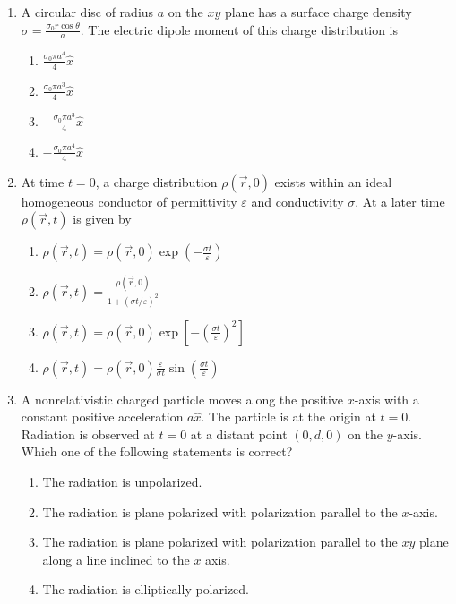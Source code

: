 \documentclass[journal]{IEEEtran}
\begin{document}
\begin{enumerate}
    

 
    \item A circular disc of radius $a$ on the $x y$ plane has a surface charge density $\sigma=\frac{\sigma_{0} r \cos \theta}{a}$. The electric dipole moment of this charge distribution is
    \begin{multicols}{4}
			\begin{enumerate}
\item $\frac{\sigma_{0} \pi a^{4}}{4} \hat{x}$
\item $\frac{\sigma_{0} \pi a^{3}}{4} \hat{x}$
\item $-\frac{\sigma_{0} \pi a^{3}}{4} \hat{x}$
\item $-\frac{\sigma_{0} \pi a^{4}}{4} \hat{x}$
        \end{enumerate}
		\end{multicols}

    \item At time $t=0$, a charge distribution $\rho(\vec{r}, 0)$ exists within an ideal homogeneous conductor of permittivity $\varepsilon$ and conductivity $\sigma$. At a later time $\rho(\vec{r}, t)$ is given by


		\begin{multicols}{1}
			\begin{enumerate}
	\item  $\rho(\vec{r}, t)=\rho(\vec{r}, 0) \exp \left(-\frac{\sigma t}{\varepsilon}\right)$
\item $\rho(\vec{r}, t)=\frac{\rho(\vec{r}, 0)}{1+(\sigma t / \varepsilon)^{2}}$
\item $\rho(\vec{r}, t)=\rho(\vec{r}, 0) \exp \left[-\left(\frac{\sigma t}{\varepsilon}\right)^{2}\right]$
\item $\rho(\vec{r}, t)=\rho(\vec{r}, 0) \frac{\varepsilon}{\sigma t} \sin \left(\frac{\sigma t}{\varepsilon}\right)$
			\end{enumerate}
		\end{multicols}

    \item  A nonrelativistic charged particle moves along the positive $x$-axis with a constant positive acceleration $a \hat{x}$. The particle is at the origin at $t=0$. Radiation is observed at $t=0$ at a distant point $(0, d, 0)$ on the $y$-axis. Which one of the following statements is correct?
        
            \begin{enumerate}
             \item The radiation is unpolarized.
\item The radiation is plane polarized with polarization parallel to the $x$-axis.
\item The radiation is plane polarized with polarization parallel to the $x y$ plane along a line inclined to the $x$ axis.
\item The radiation is elliptically polarized.
            \end{enumerate}




\end{enumerate}
\end{document}

